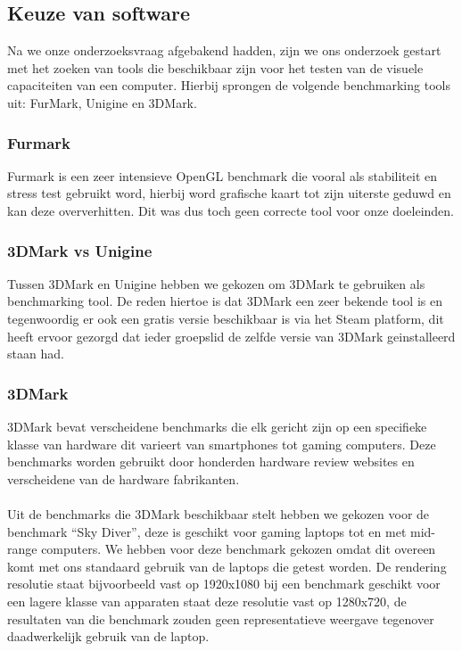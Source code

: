 \subsection{Keuze van software}
Na we onze onderzoeksvraag afgebakend hadden, zijn we ons onderzoek gestart met het zoeken van tools die beschikbaar zijn voor het testen van de visuele capaciteiten van een computer. Hierbij sprongen de volgende benchmarking tools uit: FurMark, Unigine en 3DMark.

\subsubsection{Furmark}
Furmark is een zeer intensieve OpenGL benchmark die vooral als stabiliteit en stress test gebruikt word, hierbij word grafische kaart tot zijn uiterste geduwd en kan deze oververhitten. Dit was dus toch geen correcte tool voor onze doeleinden. \citep{furmark}

\subsubsection{3DMark vs Unigine}
Tussen 3DMark en Unigine hebben we gekozen om 3DMark te gebruiken als benchmarking tool. De reden hiertoe is dat 3DMark een zeer bekende tool is en tegenwoordig er ook een gratis versie beschikbaar is via het Steam platform, dit heeft ervoor gezorgd dat ieder groepslid de zelfde versie van 3DMark geinstalleerd staan had.

\subsubsection{3DMark}
3DMark bevat verscheidene benchmarks die elk gericht zijn op een specifieke klasse van hardware dit varieert van smartphones tot gaming computers. Deze benchmarks worden gebruikt door honderden hardware review websites en verscheidene van de hardware fabrikanten.\\\\
Uit de benchmarks die 3DMark beschikbaar stelt hebben we gekozen voor de benchmark “Sky Diver”, deze is geschikt voor gaming laptops tot en met mid-range computers. We hebben voor deze benchmark gekozen omdat dit overeen komt met ons standaard gebruik van de laptops die getest worden. De rendering resolutie staat bijvoorbeeld vast op 1920x1080 bij een benchmark geschikt voor een lagere klasse van apparaten staat deze resolutie vast op 1280x720, de resultaten van die benchmark zouden geen representatieve weergave tegenover daadwerkelijk gebruik van de laptop.

